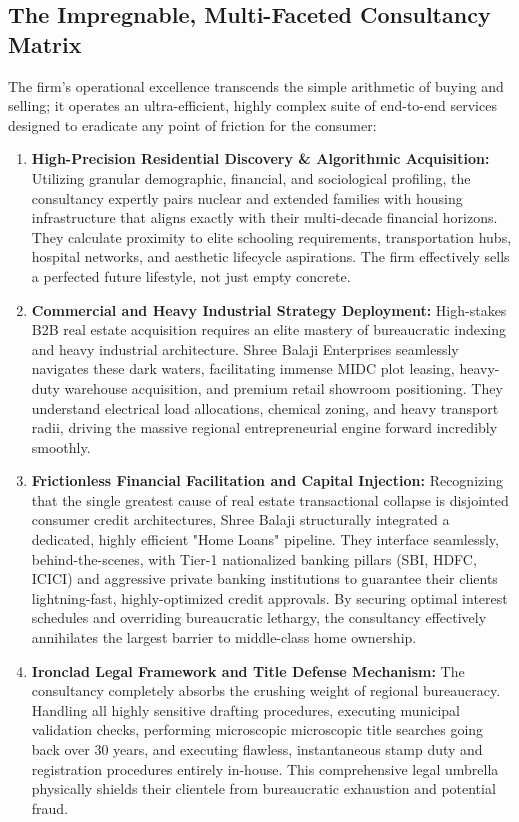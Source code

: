 \subsection{The Impregnable, Multi-Faceted Consultancy Matrix}
The firm’s operational excellence transcends the simple arithmetic of buying and selling; it operates an ultra-efficient, highly complex suite of end-to-end services designed to eradicate any point of friction for the consumer:

\begin{enumerate}[label=\textbf{\arabic*.}]
    \item \textbf{High-Precision Residential Discovery \& Algorithmic Acquisition:} Utilizing granular demographic, financial, and sociological profiling, the consultancy expertly pairs nuclear and extended families with housing infrastructure that aligns exactly with their multi-decade financial horizons. They calculate proximity to elite schooling requirements, transportation hubs, hospital networks, and aesthetic lifecycle aspirations. The firm effectively sells a perfected future lifestyle, not just empty concrete.
    
    \item \textbf{Commercial and Heavy Industrial Strategy Deployment:} High-stakes B2B real estate acquisition requires an elite mastery of bureaucratic indexing and heavy industrial architecture. Shree Balaji Enterprises seamlessly navigates these dark waters, facilitating immense MIDC plot leasing, heavy-duty warehouse acquisition, and premium retail showroom positioning. They understand electrical load allocations, chemical zoning, and heavy transport radii, driving the massive regional entrepreneurial engine forward incredibly smoothly.
    
    \item \textbf{Frictionless Financial Facilitation and Capital Injection:} Recognizing that the single greatest cause of real estate transactional collapse is disjointed consumer credit architectures, Shree Balaji structurally integrated a dedicated, highly efficient "Home Loans" pipeline. They interface seamlessly, behind-the-scenes, with Tier-1 nationalized banking pillars (SBI, HDFC, ICICI) and aggressive private banking institutions to guarantee their clients lightning-fast, highly-optimized credit approvals. By securing optimal interest schedules and overriding bureaucratic lethargy, the consultancy effectively annihilates the largest barrier to middle-class home ownership.
    
    \item \textbf{Ironclad Legal Framework and Title Defense Mechanism:} The consultancy completely absorbs the crushing weight of regional bureaucracy. Handling all highly sensitive drafting procedures, executing municipal validation checks, performing microscopic microscopic title searches going back over 30 years, and executing flawless, instantaneous stamp duty and registration procedures entirely in-house. This comprehensive legal umbrella physically shields their clientele from bureaucratic exhaustion and potential fraud.
    

\end{enumerate}
